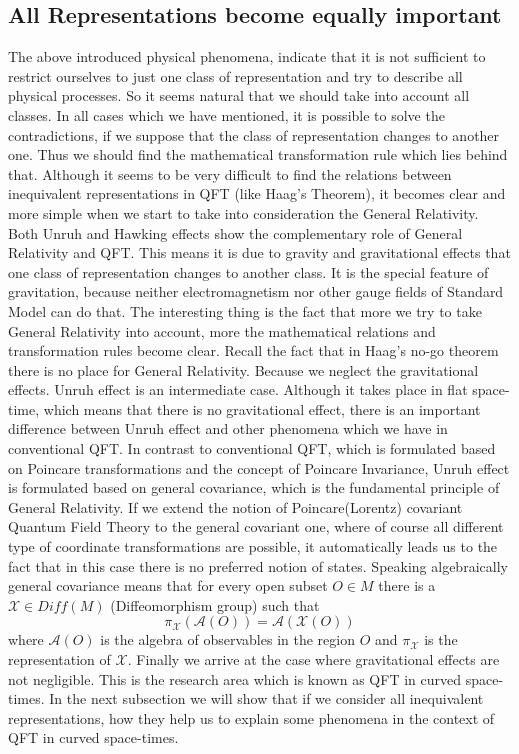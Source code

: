 \documentclass[12pt]{article}
\begin{document}
\subsection{All Representations become equally important}
The above introduced physical phenomena, indicate that it is not sufficient to restrict ourselves to just one class of representation and try to describe all physical processes. So it seems natural that we should take into account all classes. In all cases which we have mentioned, it is possible to solve the contradictions, if we suppose that the class of representation changes to another one. Thus we should find the mathematical transformation rule which lies behind that. Although it seems to be very difficult to find the relations between inequivalent representations in QFT (like Haag's Theorem), it becomes clear and more simple when we start  to take into consideration the General Relativity. Both Unruh and Hawking effects show the complementary role of General Relativity and QFT. This means it is due to gravity and gravitational effects that one class of representation changes to another class. It is the special feature of gravitation, because neither electromagnetism nor other gauge fields of Standard Model can do that. The interesting thing is the fact that more we try to take General Relativity into account, more the mathematical relations and transformation rules  become clear. Recall the fact that in Haag's no-go theorem there is no place for General Relativity. Because we neglect the gravitational effects. Unruh effect is an intermediate case. Although it takes place in flat space-time, which means that there is no gravitational effect, there is an important difference between Unruh effect and other phenomena which we have in conventional QFT. In contrast to conventional QFT, which is formulated based on Poincare transformations and the concept of Poincare Invariance, Unruh effect is formulated based on general covariance, which is the fundamental principle of General Relativity. If we extend the notion of Poincare(Lorentz) covariant Quantum Field Theory to the general covariant one, where of course all different type of coordinate transformations are possible, it automatically leads us to the fact that in this case there is no preferred notion of states. Speaking algebraically general covariance means that for every open subset $O \in M$ there is a $\mathcal{X}  \in Diff(M)$ (Diffeomorphism group) such that  \cite{Salehi}
\begin{equation}
\pi_{\mathcal{X}}(\mathcal{A}(O))=\mathcal{A}(\mathcal{X}(O))
\end{equation}
where $\mathcal{A}(O)$ is the algebra of observables in the region $O$ and $\pi_{\mathcal{X}}$ is the representation of $\mathcal{X}$. 
Finally we arrive at the case where gravitational effects are not negligible. This is the research area which is known as QFT in curved space-times. In the next subsection we will show that if we consider all inequivalent representations, how they help us to explain some phenomena in the context of QFT in curved space-times.
\end{document}
